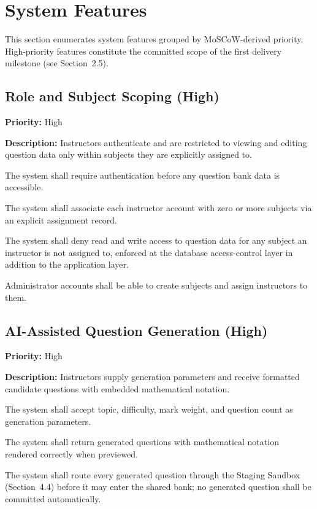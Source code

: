 \documentclass[11pt]{article}
\newcommand{\priority}[1]{\textbf{Priority:} #1}
\newcommand{\reqid}[1]{\textbf{#1}}
\begin{document}
\section{System Features}

This section enumerates system features grouped by MoSCoW-derived priority.
High-priority features constitute the committed scope of the first delivery
milestone (see Section~2.5).

\subsection{Role and Subject Scoping (High)}
\priority{High}

\textbf{Description:} Instructors authenticate and are restricted to
viewing and editing question data only within subjects they are explicitly
assigned to.

\begin{description}[nosep,leftmargin=2.2cm]
  \item[\reqid{REQ-1.1}] The system shall require authentication before any
    question bank data is accessible.
  \item[\reqid{REQ-1.2}] The system shall associate each instructor account
    with zero or more subjects via an explicit assignment record.
  \item[\reqid{REQ-1.3}] The system shall deny read and write access to
    question data for any subject an instructor is not assigned to, enforced
    at the database access-control layer in addition to the application
    layer.
  \item[\reqid{REQ-1.4}] Administrator accounts shall be able to create
    subjects and assign instructors to them.
\end{description}

\subsection{AI-Assisted Question Generation (High)}
\priority{High}

\textbf{Description:} Instructors supply generation parameters and receive
formatted candidate questions with embedded mathematical notation.

\begin{description}[nosep,leftmargin=2.2cm]
  \item[\reqid{REQ-2.1}] The system shall accept topic, difficulty, mark
    weight, and question count as generation parameters.
  \item[\reqid{REQ-2.2}] The system shall return generated questions with
    mathematical notation rendered correctly when previewed.
  \item[\reqid{REQ-2.3}] The system shall route every generated question
    through the Staging Sandbox (Section~4.4) before it may enter the
    shared bank; no generated question shall be committed automatically.
\end{description}
\end{document}
